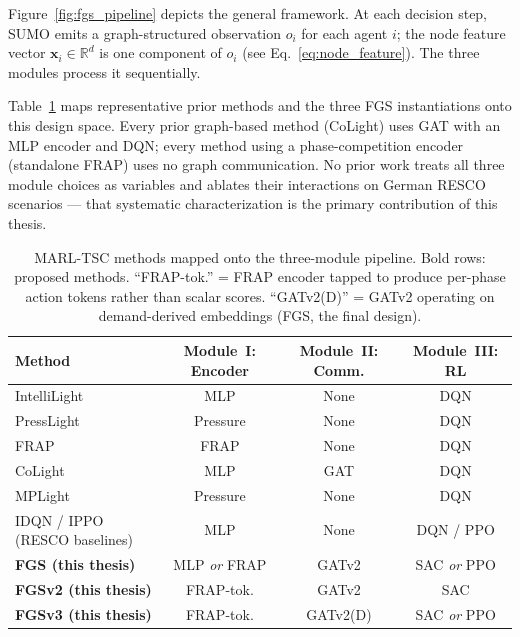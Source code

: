 Figure~\ref{fig:fgs_pipeline} depicts the general framework. At each decision step, SUMO emits a graph-structured observation $o_i$ for each agent $i$; the node feature vector $\mathbf{x}_i \in \mathbb{R}^d$ is one component of $o_i$ (see Eq.~\ref{eq:node_feature}). The three modules process it sequentially.

Table~\ref{tab:pipeline_design_space} maps representative prior methods and the three FGS instantiations onto this design space. Every prior graph-based method (CoLight) uses GAT with an MLP encoder and DQN; every method using a phase-competition encoder (standalone FRAP) uses no graph communication. No prior work treats all three module choices as variables and ablates their interactions on German RESCO scenarios — that systematic characterization is the primary contribution of this thesis.

\begin{table}[ht]
\centering
\caption{MARL-TSC methods mapped onto the three-module pipeline. Bold rows: proposed methods. ``FRAP-tok.'' = FRAP encoder tapped to produce per-phase action tokens rather than scalar scores. ``GATv2(D)'' = GATv2 operating on demand-derived embeddings (FGS, the final design).}
\label{tab:pipeline_design_space}
\small
\setlength{\tabcolsep}{6pt}
\renewcommand{\arraystretch}{1.15}
\begin{tabular}{lccc}
\toprule
\textbf{Method} & \textbf{Module~I: Encoder} & \textbf{Module~II: Comm.} & \textbf{Module~III: RL} \\
\midrule
IntelliLight \citep{wei2018intellilight}  & MLP         & None  & DQN \\
PressLight \citep{wei2019presslight}      & Pressure    & None  & DQN \\
FRAP \citep{zheng2019learning}            & FRAP        & None  & DQN \\
CoLight \citep{wei2019colight}            & MLP         & GAT   & DQN \\
MPLight \citep{chen2020toward}            & Pressure    & None  & DQN \\
IDQN / IPPO (RESCO baselines)             & MLP         & None  & DQN / PPO \\
\midrule
\textbf{FGS (this thesis)}     & MLP \emph{or} FRAP & GATv2       & SAC \emph{or} PPO \\
\textbf{FGSv2 (this thesis)}   & FRAP-tok.          & GATv2       & SAC \\
\textbf{FGSv3 (this thesis)}   & FRAP-tok.          & GATv2(D)    & SAC \emph{or} PPO \\
\bottomrule
\end{tabular}
\end{table}

